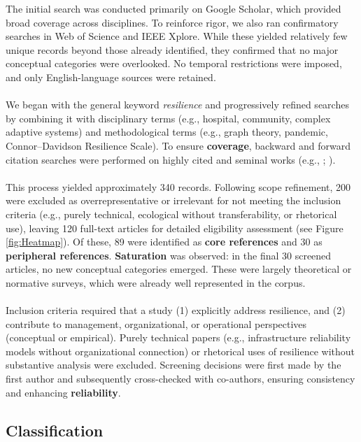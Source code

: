 The initial search was conducted primarily on Google Scholar, which provided broad coverage across disciplines. To reinforce rigor, we also ran confirmatory searches in Web of Science and IEEE Xplore. While these yielded relatively few unique records beyond those already identified, they confirmed that no major conceptual categories were overlooked. No temporal restrictions were imposed, and only English-language sources were retained.\\  
\\
We began with the general keyword \textit{resilience} and progressively refined searches by combining it with disciplinary terms (e.g., hospital, community, complex adaptive systems) and methodological terms (e.g., graph theory, pandemic, Connor–Davidson Resilience Scale). To ensure \textbf{coverage}, backward and forward citation searches were performed on highly cited and seminal works (e.g., \cite{holling1973resilience}; \cite{boh2023building}).\\  
\\
This process yielded approximately 340 records. Following scope refinement, 200 were excluded as overrepresentative or irrelevant for not meeting the inclusion criteria (e.g., purely technical, ecological without transferability, or rhetorical use), leaving 120 full-text articles for detailed eligibility assessment (see Figure \ref{fig:Heatmap}). Of these, 89 were identified as \textbf{core references} and 30 as \textbf{peripheral references}. \textbf{Saturation} was observed: in the final 30 screened articles, no new conceptual categories emerged. These were largely theoretical or normative surveys, which were already well represented in the corpus.\\
\\
Inclusion criteria required that a study (1) explicitly address resilience, and (2) contribute to management, organizational, or operational perspectives (conceptual or empirical). Purely technical papers (e.g., infrastructure reliability models without organizational connection) or rhetorical uses of resilience without substantive analysis were excluded. Screening decisions were first made by the first author and subsequently cross-checked with co-authors, ensuring consistency and enhancing \textbf{reliability}.

\subsection{Classification}

